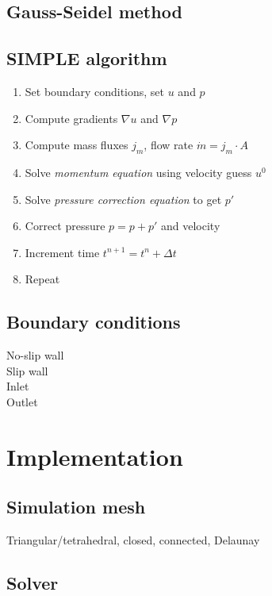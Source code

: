 \documentclass[12pt]{article}
\begin{document}
\subsection{Gauss-Seidel method}

\subsection{SIMPLE algorithm}

\begin{enumerate}
\item Set boundary conditions, set $u$ and $p$
\item Compute gradients $\nabla u$ and $\nabla p$
\item Compute mass fluxes $j_m$, flow rate $\dot m = j_m \cdot A$
\item Solve \textit{momentum equation} using velocity guess $u^0$
\item Solve \textit{pressure correction equation} to get $p'$
\item Correct pressure $p = p + p'$ and velocity
\item Increment time $t^{n+1} = t^n + \Delta t$
\item Repeat
\end{enumerate}

\subsection{Boundary conditions}

\noindent

No-slip wall\\

Slip wall\\

Inlet\\

Outlet\\

\section{Implementation}

\subsection{Simulation mesh}

Triangular/tetrahedral, closed, connected, Delaunay

\subsection{Solver}
\end{document}
